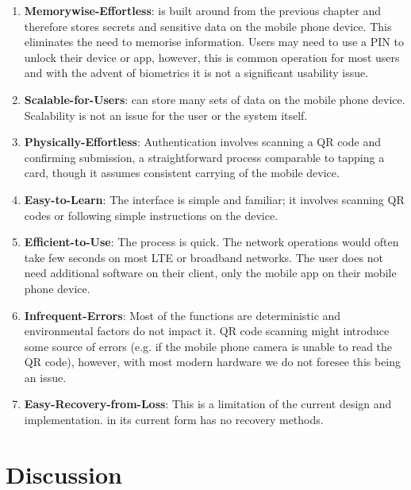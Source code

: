 \begin{enumerate}
\item \textbf{Memorywise-Effortless}: \formless is built around \deeid from the previous chapter and therefore stores secrets and sensitive data on the mobile phone device. This eliminates the need to memorise information. Users may need to use a PIN to unlock their device or app, however, this is common operation for most users and with the advent of biometrics it is not a significant usability issue.

\item \textbf{Scalable-for-Users}: \formless can store many sets of data on the mobile phone device. Scalability is not an issue for the user or the system itself.

\item \textbf{Physically-Effortless}: Authentication involves scanning a QR code and confirming submission, a straightforward process comparable to tapping a card, though it assumes consistent carrying of the mobile device.

\item \textbf{Easy-to-Learn}: The interface is simple and familiar; it involves scanning QR codes or following simple instructions on the device.

\item \textbf{Efficient-to-Use}: The process is quick. The network operations would often take few seconds on most LTE or broadband networks. The user does not need additional software on their client, only the mobile app on their mobile phone device.

\item \textbf{Infrequent-Errors}: Most of the functions are deterministic and environmental factors do not impact it. QR code scanning might introduce some source of errors (e.g. if the mobile phone camera is unable to read the QR code), however, with most modern hardware we do not foresee this being an issue.

\item \textbf{Easy-Recovery-from-Loss}: This is a limitation of the current design and implementation. \formless in its current form has no recovery methods.
\end{enumerate}

\section{Discussion}
\label{sec::chp7::discussion}

